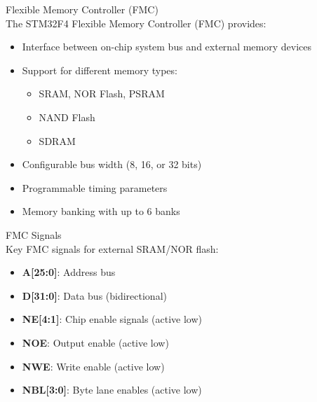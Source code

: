 \begin{concept}{Flexible Memory Controller (FMC)}\\
The STM32F4 Flexible Memory Controller (FMC) provides:
\begin{itemize}
    \item Interface between on-chip system bus and external memory devices
    \item Support for different memory types:
    \begin{itemize}
        \item SRAM, NOR Flash, PSRAM
        \item NAND Flash
        \item SDRAM
    \end{itemize}
    \item Configurable bus width (8, 16, or 32 bits)
    \item Programmable timing parameters
    \item Memory banking with up to 6 banks
\end{itemize}
\end{concept}

\begin{definition}{FMC Signals}\\
Key FMC signals for external SRAM/NOR flash:
\begin{itemize}
    \item \textbf{A[25:0]}: Address bus
    \item \textbf{D[31:0]}: Data bus (bidirectional)
    \item \textbf{NE[4:1]}: Chip enable signals (active low)
    \item \textbf{NOE}: Output enable (active low)
    \item \textbf{NWE}: Write enable (active low)
    \item \textbf{NBL[3:0]}: Byte lane enables (active low)
\end{itemize}
\end{definition}

